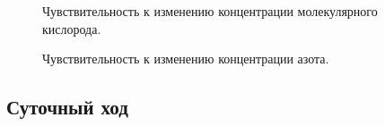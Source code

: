\documentclass[14pt, a4paper, fleqn, twoside]{extreport}
\begin{document}
\begin{figure}
\caption{Чувствительность к изменению концентрации молекулярного кислорода.}
\end{figure}

\begin{figure}
\caption{Чувствительность к изменению концентрации азота.}
\end{figure}

\newpage

\subsection*{Суточный ход}
\end{document}
